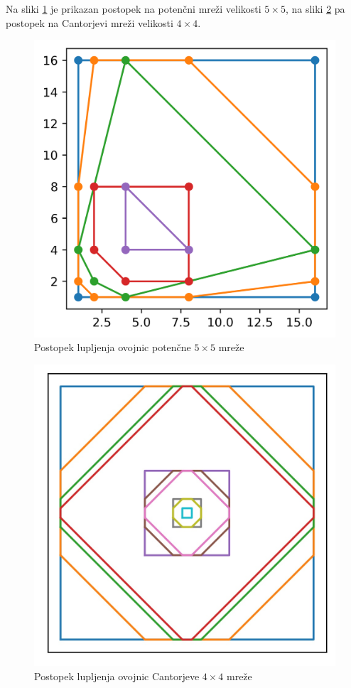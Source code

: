 \documentclass[a4paper]{article}
\begin{document}
Na sliki \ref{fig:5x5} je prikazan postopek na potenčni mreži velikosti $5 \times 5$, na sliki \ref{fig:cantor} pa postopek na Cantorjevi mreži velikosti $4 \times 4$.

\begin{figure}[!h]
	\centering
	\caption{Postopek lupljenja ovojnic potenčne $5 \times 5$ mreže}
	\label{fig:5x5}
	\includegraphics[scale=0.5]{slike/5x5_potencna.png}
\end{figure}

\begin{figure}[!h]
	\centering
	\caption{Postopek lupljenja ovojnic Cantorjeve $4 \times 4$ mreže}
	\label{fig:cantor}
	\includegraphics[scale=0.5]{slike/kvazi_cantor.jpg}
\end{figure}
\end{document}
